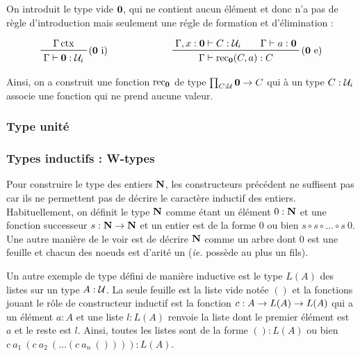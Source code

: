\documentclass[../../rapport.tex]{subfiles}
\begin{document}
  On introduit le type vide $\operatorname{\textbf{0}}$, qui ne contient aucun élément et donc n'a pas de règle d'introduction mais seulement
  une régle de formation et d'élimination :

  $$
  \prfinterspace=2em
  \begin{array}{cc}
    \prftree[r]{($\0$ i)}{\Gamma \ctx}{\Gamma \vdash \0 : \U_i} \hspace{2cm}
    & \prftree[r]{($\0$ e)}{\Gamma, x : \0 \vdash C : \U_i}{\Gamma \vdash a : \0}{\Gamma \vdash \rec_{\0}(C, a) : C}
  \end{array}
  $$

  Ainsi, on a construit une fonction $\operatorname{rec}_{\operatorname{\textbf{0}}}$ de type $\prod_{C: \mathcal U} \operatorname{\textbf{0}} \rightarrow C$
  qui à un type $C : \mathcal U_i$ associe une fonction qui ne prend aucune valeur.

  \subsubsection{Type unité}

  \subsubsection{Types inductifs : W-types}

  Pour construire le type des entiers $\mathbf N$, les constructeurs précédent ne suffisent pas car ils ne permettent
  pas de décrire le caractère inductif des entiers.
  Habituellement, on définit le type $\mathbf N$ comme étant un élément $0 : \mathbf N$ et une fonction successeur
  $s : \mathbf N \rightarrow \mathbf N$ et un entier est de la forme $0$ ou bien $s\circ s \circ \hdots \circ s\ 0$.
  Une autre manière de le voir est de décrire $\mathbf N$ comme un arbre dont $0$ est une feuille et
  chacun des noeuds est d'arité un (\textit{ie.} possède au plus un fils).

  \begin{figure}[ht]
    \centering
  \end{figure}

  Un autre exemple de type défini de manière inductive est le type $L(A)$ des listes sur un type $A : \mathcal U$.
  La seule feuille est la liste vide notée $()$ et la fonctions jouant le rôle de constructeur inductif est
  la fonction $c : A \rightarrow L(A) \rightarrow L(A)$ qui a un élément $a : A$ et une liste $l : L(A)$ renvoie la liste
  dont le premier élément est $a$ et le reste est $l$.
  Ainsi, toutes les listes sont de la forme $() : L(A)$ ou bien $c\ a_1\ (c\ a_2\ (\hdots (c\ a_n\ ()))) :L(A)$.
\end{document}
